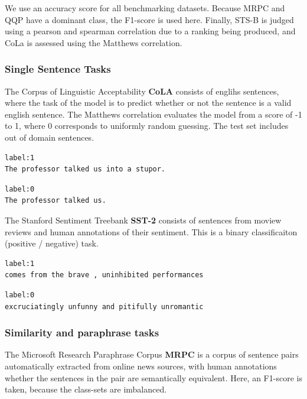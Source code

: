 \documentclass[a4paper,12pt,twoside,openright]{report}
\begin{document}
We use an accuracy score for all benchmarking datasets. Because MRPC and QQP have a dominant class, the F1-score is used here. Finally, STS-B is judged using a pearson and spearman correlation due to a ranking being produced, and CoLa is assessed using the Matthews correlation.

\subsubsection{Single Sentence Tasks}

The Corpus of Linguistic Acceptability \textbf{CoLA} \cite{warstadt2018} consists of englihs sentences, where the task of the model is to predict whether or not the sentence is a valid english sentence.
The Matthews correlation evaluates the model from a score of -1 to 1, where 0 corresponds to uniformly random guessing.
The test set includes out of domain sentences.

\begin{verbatim}
label:1
The professor talked us into a stupor.
\end{verbatim}

\begin{verbatim}
label:0	
The professor talked us.
\end{verbatim}


The Stanford Sentiment Treebank \textbf{SST-2} \cite{socher2013} consists of sentences from moview reviews and human annotations of their sentiment.
This is a binary classificaiton (positive / negative) task.


\begin{verbatim}
label:1
comes from the brave , uninhibited performances
\end{verbatim}

\begin{verbatim}
label:0
excruciatingly unfunny and pitifully unromantic
\end{verbatim}

\subsubsection{Similarity and paraphrase tasks}

The Microsoft Research Paraphrase Corpus \textbf{MRPC} \cite{dolan2005} is a corpus of sentence pairs automatically extracted from online news sources, with human annotations whether the sentences in the pair are semantically equivalent.
Here, an F1-score is taken, because the class-sets are imbalanced.
\end{document}
